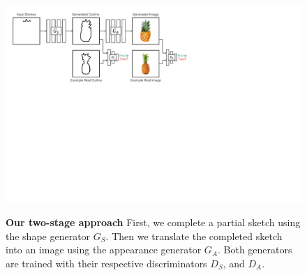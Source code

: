 \begin{figure}[t]
    \centering  
    \includegraphics[width=\linewidth]{paper_images/isf_method_v3.pdf} 
    \\
    \vspace{-4mm}
        \caption{{\bf Our two-stage approach} First, we complete a partial sketch using the shape generator $G_S$. Then we translate the completed sketch into an image using the appearance generator $G_A$. Both generators are trained with their respective discriminators $D_S$, and $D_A$.
        {}}\label{fig:SketchFillNet}
\end{figure}




